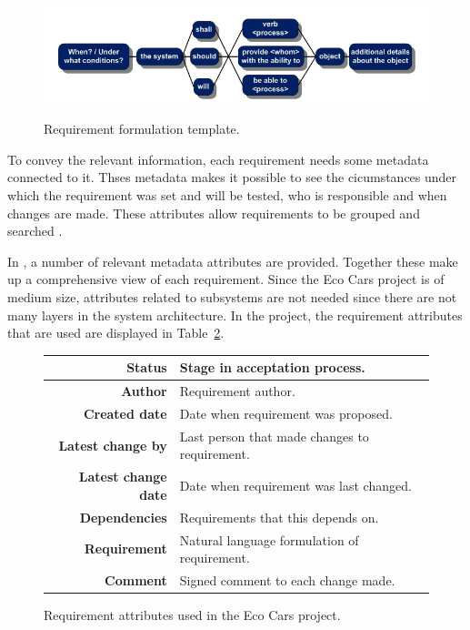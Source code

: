 \begin{figure}[H]
    \centering
    \includegraphics[width=\textwidth]{./img/introduction_req_template}
    \label{fig:req_template}
    \caption{Requirement formulation template.}
\end{figure}

To convey the relevant information, each requirement needs some metadata
connected to it. Thses metadata makes it possible to see the cicumstances under
which the requirement was set and will be tested, who is responsible and when
changes are made. These attributes allow requirements to be grouped and searched
\cite{ibm_req}.

In \cite{ibm_req}, a number of relevant metadata attributes are provided.
Together these make up a comprehensive view of each requirement. Since the Eco
Cars project is of medium size, attributes related to subsystems are not needed
since there are not many layers in the system architecture. In the project, the
requirement attributes that are used are displayed in Table~\ref{tab:req_attr}.

\begin{figure}[H]
    \centering
    \label{tab:req_attr}
    \caption{Requirement attributes used in the Eco Cars project.}
    \begin{tabular}{r | l }
        \bf{Status} & Stage in acceptation process. \\
        \hline
        \bf{Author} & Requirement author. \\
        \hline
        \bf{Created date} & Date when requirement was proposed. \\
        \hline
        \bf{Latest change by} & Last person that made changes to requirement. \\
        \hline
        \bf{Latest change date} & Date when requirement was last changed. \\
        \hline
        \bf{Dependencies} & Requirements that this depends on. \\
        \hline
        \bf{Requirement} & Natural language formulation of requirement. \\
        \hline
        \bf{Comment} & Signed comment to each change made.
    \end{tabular}
\end{figure}

